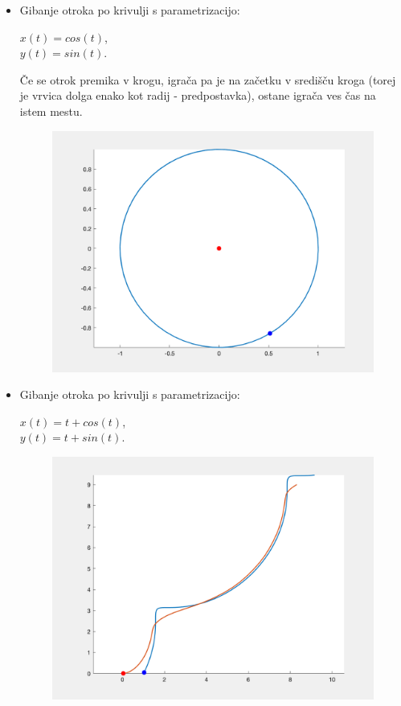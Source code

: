 \documentclass[a4paper,12pt]{article}
\begin{document}
\begin{itemize}
    \item Gibanje otroka po krivulji s parametrizacijo:
    \begin{center}
    $x(t) = cos(t)$, \\
    $y(t) = sin(t)$. 
    \end{center}
    Če se otrok premika v krogu, igrača pa je na začetku v središču kroga (torej je vrvica dolga enako kot radij - predpostavka), ostane igrača ves čas na istem mestu.
    \begin{figure}[!h]
        \centering
        \includegraphics[scale=0.4]{Primer1}
    \end{figure}

    \newpage
    \item Gibanje otroka po krivulji s parametrizacijo:
    \begin{center}
    $x(t) = t + cos(t)$, \\
    $y(t) = t + sin(t)$. 
    \end{center}      
    \begin{figure}[!h]
        \centering
        \includegraphics[scale=0.4]{Primer2}
    \end{figure}


\end{itemize}
\end{document}
